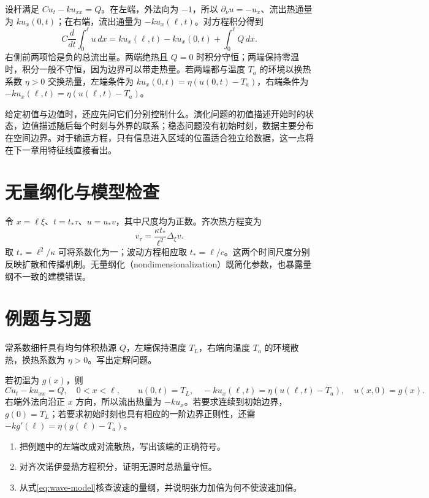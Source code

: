 \begin{example}[边界法向与总热量]
设杆满足 $C u_t-ku_{xx}=Q$。在左端，外法向为 $-1$，所以 $\partial_\nu u=-u_x$、流出热通量为 $ku_x(0,t)$；在右端，流出通量为 $-ku_x(\ell,t)$。对方程积分得到
\[
 C\frac d{dt}\int_0^\ell u\,dx
 =k u_x(\ell,t)-k u_x(0,t)+\int_0^\ell Q\,dx.
\]
右侧前两项恰是负的总流出量。两端绝热且 $Q=0$ 时积分守恒；两端保持零温时，积分一般不守恒，因为边界可以带走热量。若两端都与温度 $T_a$ 的环境以换热系数 $\eta>0$ 交换热量，左端条件为 $ku_x(0,t)=\eta(u(0,t)-T_a)$，右端条件为 $-ku_x(\ell,t)=\eta(u(\ell,t)-T_a)$。
\end{example}

给定初值与边值时，还应先问它们分别控制什么。演化问题的初值描述开始时的状态，边值描述随后每个时刻与外界的联系；稳态问题没有初始时刻，数据主要分布在空间边界。对于输运方程，只有信息进入区域的位置适合独立给数据，这一点将在下一章用特征线直接看出。

\section{无量纲化与模型检查}
令 $x=\ell\xi$、$t=t_*\tau$、$u=u_*v$，其中尺度均为正数。齐次热方程变为
\[
 v_\tau=\frac{\kappa t_*}{\ell^2}\Delta_\xi v.
\]
取 $t_*=\ell^2/\kappa$ 可将系数化为一；波动方程相应取 $t_*=\ell/c$。这两个时间尺度分别反映扩散和传播机制。无量纲化（nondimensionalization）既简化参数，也暴露量纲不一致的建模错误。

\section{例题与习题}
\begin{example}
常系数细杆具有均匀体积热源 $Q$，左端保持温度 $T_L$，右端向温度 $T_a$ 的环境散热，换热系数为 $\eta>0$。写出定解问题。
\end{example}
\begin{solve}
若初温为 $g(x)$，则
\[
 C u_t-ku_{xx}=Q,\quad 0<x<\ell,\qquad
 u(0,t)=T_L,\quad -k u_x(\ell,t)=\eta(u(\ell,t)-T_a),\quad
 u(x,0)=g(x).
\]
右端外法向沿正 $x$ 方向，所以流出热量为 $-ku_x$。若要求连续到初始边界，$g(0)=T_L$；若要求初始时刻也具有相应的一阶边界正则性，还需 $-kg'(\ell)=\eta(g(\ell)-T_a)$。
\end{solve}
\begin{enumerate}
 \item 把例题中的左端改成对流散热，写出该端的正确符号。
 \item 对齐次诺伊曼热方程积分，证明无源时总热量守恒。
 \item 从式\eqref{eq:wave-model}核查波速的量纲，并说明张力加倍为何不使波速加倍。
\end{enumerate}


